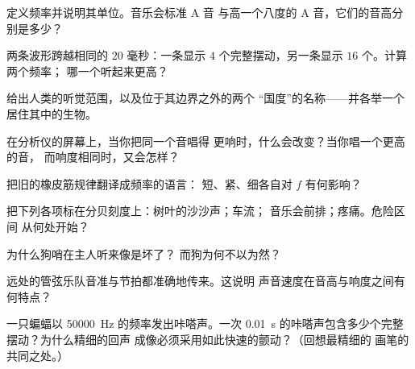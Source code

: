 \begin{exercise}[$\star$]\label{exo:g8:sound-pitch-loudness:1}
定义频率并说明其单位。音乐会标准 A 音
与高一个八度的 A 音，它们的音高分别是多少？
\end{exercise}

\begin{exercise}[$\star$]\label{exo:g8:sound-pitch-loudness:2}
两条波形跨越相同的 $20$ 毫秒：一条显示 $4$
个完整摆动，另一条显示 $16$ 个。计算两个频率；
哪一个听起来更高？
\end{exercise}

\begin{exercise}[$\star$]\label{exo:g8:sound-pitch-loudness:3}
给出人类的听觉范围，以及位于其边界之外的两个
“国度”的名称——并各举一个
居住其中的生物。
\end{exercise}

\begin{exercise}[$\star$]\label{exo:g8:sound-pitch-loudness:4}
在分析仪的屏幕上，当你把同一个音唱得
更响时，什么会改变？当你唱一个更高的音，
而响度相同时，又会怎样？
\end{exercise}

\begin{exercise}[$\star$]\label{exo:g8:sound-pitch-loudness:5}
把旧的橡皮筋规律翻译成频率的语言：
短、紧、细各自对 $f$ 有何影响？
\end{exercise}

\begin{exercise}[$\star$]\label{exo:g8:sound-pitch-loudness:6}
把下列各项标在分贝刻度上：树叶的沙沙声；车流；
音乐会前排；疼痛。危险区间
从何处开始？
\end{exercise}

\begin{exercise}[$\star$]\label{exo:g8:sound-pitch-loudness:7}
为什么狗哨在主人听来像是坏了？
而狗为何不以为然？
\end{exercise}

\begin{exercise}[$\star$]\label{exo:g8:sound-pitch-loudness:8}
远处的管弦乐队音准与节拍都准确地传来。这说明
声音速度在音高与响度之间有何特点？
\end{exercise}

\begin{exercise}[$\star\star$]\label{exo:g8:sound-pitch-loudness:9}
一只蝙蝠以 \qty{50000}{Hz} 的频率发出咔嗒声。一次
\qty{0.01}{s} 的咔嗒声包含多少个完整摆动？为什么精细的回声
成像必须采用如此快速的颤动？（回想最精细的
画笔的共同之处。）
\end{exercise}

